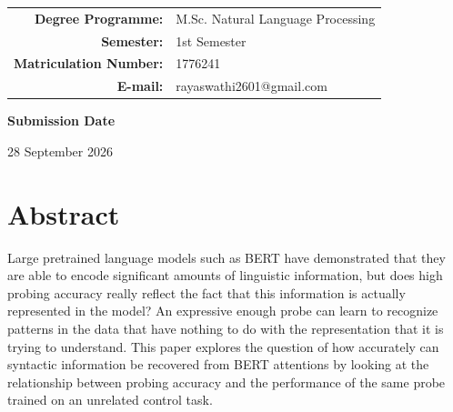 \documentclass[12pt,a4paper]{article}
\begin{document}
\begin{titlepage}
\begin{center}
\begin{tabular}{@{}rl@{}}
            \textbf{Degree Programme:}
            & M.Sc. Natural Language Processing \\[0.35cm]

            \textbf{Semester:}
            & 1st Semester \\[0.35cm]

            \textbf{Matriculation Number:}
            & 1776241 \\[0.35cm]

            \textbf{E-mail:}
            & rayaswathi2601@gmail.com
        \end{tabular}

        \vfill

        {\large
        \textbf{Submission Date}
        \par}

        \vspace{0.15cm}

        {\large 28 September 2026\par}

    \end{center}
\end{titlepage}


\section*{Abstract}

Large pretrained language models such as BERT have demonstrated that they are able to encode significant amounts of linguistic information, but does high probing accuracy really reflect the fact that this information is actually represented in the model? An expressive enough probe can learn to recognize patterns in the data that have nothing to do with the representation that it is trying to understand. This paper explores the question of how accurately can syntactic information be recovered from BERT attentions by looking at the relationship between probing accuracy and the performance of the same probe trained on an unrelated control task.
\end{document}
